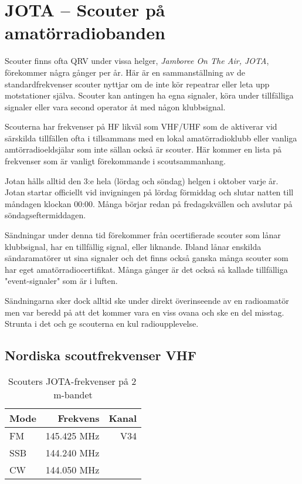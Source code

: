\normalsize

\section{JOTA -- Scouter på amatörradiobanden}

Scouter finns ofta QRV under vissa helger, \textit{Jamboree On The Air, JOTA},
förekommer några gånger per år. Här är en sammanställning av de
standardfrekvenser scouter nyttjar om de inte kör repeatrar eller leta upp
motstationer själva. Scouter kan antingen ha egna signaler, köra under
tillfälliga signaler eller vara second operator åt med någon klubbsignal.

Scouterna har frekvenser på HF likväl som VHF/UHF som de aktiverar vid
särskilda tillfällen ofta i tillsammans med en lokal amatörradioklubb eller
vanliga amtörradioeldsjälar som inte sällan också är scouter. Här kommer en
lista på frekvenser som är vanligt förekommande i scoutsammanhang.

Jotan hålls alltid den 3:e hela (lördag och söndag) helgen i oktober varje år.
Jotan startar officiellt vid invigningen på lördag förmiddag och slutar natten
till måndagen klockan 00:00. Många börjar redan på fredagskvällen och avslutar
på söndagseftermiddagen.

Sändningar under denna tid förekommer från ocertifierade scouter som lånar
klubbsignal, har en tillfällig signal, eller liknande. Ibland lånar
enskilda sändaramatörer ut sina signaler och det finns också ganska många
scouter som har eget amatörradiocertifikat. Många gånger är det också så
kallade tillfälliga "event-signaler" som är i luften.

Sändningarna sker dock alltid ske under direkt överinseende av en radioamatör
men var beredd på att det kommer vara en viss ovana och ske en del misstag.
Strunta i det och ge scouterna en kul radioupplevelse.

\subsection{Nordiska scoutfrekvenser VHF}

\begin{table}[h]
\centering
\begin{tabular}{lrr}
	\textbf{Mode} & \textbf{Frekvens} & \textbf{Kanal} \\ \hline
	FM            &      145.425  MHz &   V34 \\
	SSB           &      144.240  MHz &  \\
	CW            &      144.050  MHz &
\end{tabular}
\caption{Scouters JOTA-frekvenser på 2\,m-bandet}
\end{table}

